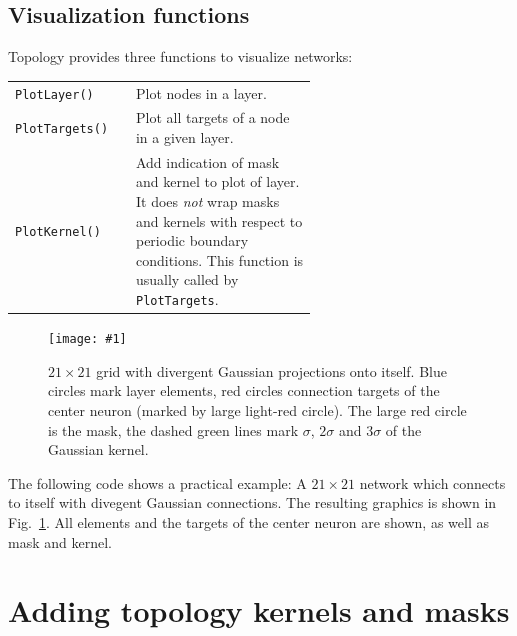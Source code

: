 \documentclass[a4paper,12pt]{report}
\newcommand{\scriptfig}[4]{%
\begin{figure}
\centerline{\texttt{[image: \#1]}}
\caption[#3]{#4}
\label{fig:#1}
\end{figure}%
}
\begin{document}
\section{Visualization functions}\label{sec:visualize}

Topology provides three functions to visualize networks:
\begin{longtable}{lp{0.6\linewidth}}
\lstinline!PlotLayer()! 
&
    Plot nodes in a layer.\\
\lstinline!PlotTargets()!
&
    Plot all targets of a node in a given layer.\\
\lstinline!PlotKernel()!
&
    Add indication of mask and kernel to plot of layer. It
    does \emph{not} wrap masks and kernels with respect to periodic
    boundary conditions. This function
    is usually called by \lstinline!PlotTargets!.
\end{longtable}

\scriptfig{vislayer}{0.7}{Example of layer visualization.}%
{$21\times21$ grid with divergent Gaussian projections onto itself. 
Blue circles mark layer elements, red circles connection targets of
the center neuron (marked by large light-red circle). The large red
circle is the mask, the dashed green lines mark $\sigma$, $2\sigma$
and $3\sigma$ of the Gaussian kernel.}

The following code shows a practical example: A $21\times21$ network
which connects to itself with divegent Gaussian connections. The
resulting graphics is shown in Fig.~\ref{fig:vislayer}. All
elements and the targets of the center neuron are shown, as well as
mask and kernel.
%



\chapter{Adding topology kernels and masks}\label{ch:extending}
\end{document}
